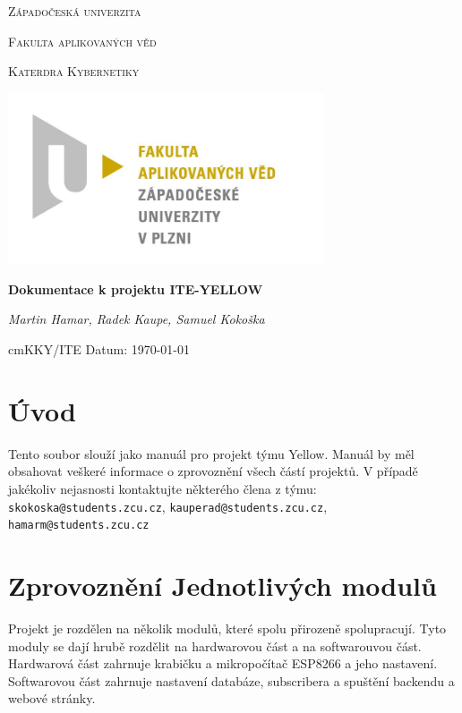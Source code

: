 \documentclass{article}
\begin{document}
\begin{titlepage}

	\centering

	{\scshape\LARGE Západočeská univerzita\par}
	{\scshape\Large Fakulta aplikovaných věd \par}
	{\scshape\Large Katerdra Kybernetiky \par}
	{\begin{center}
			\includegraphics[width=0.7\textwidth]{../pic/fav.jpg}
		\end{center}}

	{\huge\bfseries Dokumentace k projektu ITE-YELLOW\par} %

	\vspace{2cm}

	{\Large\itshape Martin Hamar, Radek Kaupe, Samuel Kokoška\par}

	\vfill

	\vspace{1cm}

	 cm{KKY/ITE} \hfill {Datum: \today }



\end{titlepage}

\section{Úvod}
Tento soubor slouží jako manuál pro projekt týmu Yellow. Manuál by měl obsahovat veškeré informace o zprovoznění všech částí projektů. V případě jakékoliv nejasnosti kontaktujte některého člena z týmu: \texttt{skokoska@students.zcu.cz}, \texttt{kauperad@students.zcu.cz}, \texttt{hamarm@students.zcu.cz}

\section{Zprovoznění Jednotlivých modulů}
Projekt je rozdělen na několik modulů, které spolu přirozeně spolupracují. Tyto moduly se dají hrubě rozdělit na hardwarovou část a na softwarouvou část.
Hardwarová část zahrnuje krabičku a mikropočítač ESP8266 a jeho nastavení. Softwarovou část zahrnuje nastavení databáze, subscribera a spuštění backendu a webové stránky.
\end{document}
